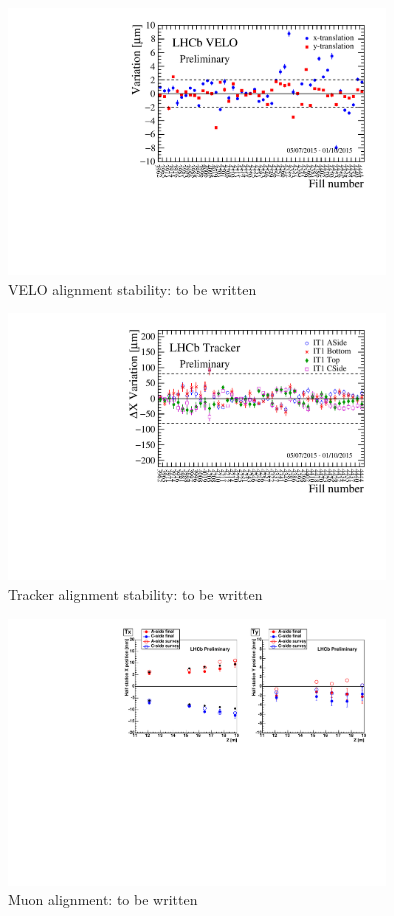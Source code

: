 \begin{figure}[h]
  \centering
  \includegraphics[width=10cm]{../figures/VeloStability}
  \caption{VELO alignment stability: to be written
}
  \label{fig:VeloStability}
\end{figure}

\begin{figure}[h]
  \centering
  \includegraphics[width=10cm]{../figures/TrackerStability}
  \caption{Tracker alignment stability: to be written
}
  \label{fig:TrackerStability}
\end{figure}


\begin{figure}[h]
  \centering
  \includegraphics[width=10cm]{../figures/MuonAlignment2015Start}
  \caption{Muon alignment: to be written
}
  \label{fig:MuonAlignment}
\end{figure}


